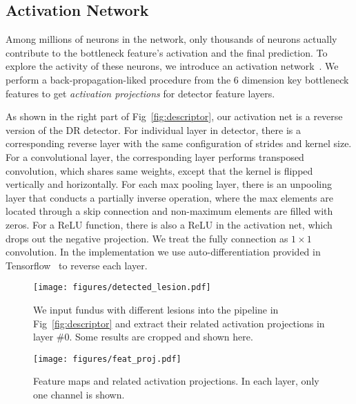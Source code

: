 \documentclass[letterpaper]{article} %
\begin{document}

	\subsection{Activation Network}

    Among millions of neurons in the network, only thousands of neurons actually contribute to the bottleneck feature's activation and the final prediction. To explore the activity of these neurons, we introduce an activation network~\cite{zeiler2014visualizing}. We perform a back-propagation-liked procedure from the $6$ dimension key bottleneck features to get \emph{activation projections} for detector feature layers.

    As shown in the right part of Fig~\ref{fig:descriptor}, our activation net is a reverse version of the DR detector. For individual layer in detector, there is a corresponding reverse layer with the same configuration of strides and kernel size. For a convolutional layer, the corresponding layer performs transposed convolution, which shares same weights, except that the kernel is flipped vertically and horizontally. For each max pooling layer, there is an unpooling layer that conducts a partially inverse operation, where the max elements are located through a skip connection and non-maximum elements are filled with zeros. For a ReLU function, there is also a ReLU in the activation net, which drops out the negative projection. We treat the fully connection as $1\times 1$ convolution. In the implementation we use auto-differentiation provided in Tensorflow~\cite{abadi2016tensorflow} to reverse each layer. %

	\begin{figure}[t]
		\begin{center}
			\texttt{[image: figures/detected\_lesion.pdf]}
		\end{center}
		\caption{We input fundus with different lesions into the pipeline in Fig~\ref{fig:descriptor} and extract their related activation projections in layer \#0. Some results are cropped and shown here. }
		\label{fig:detected_lesion}
	\end{figure}

	\begin{figure}[t]
		\begin{center}
			\texttt{[image: figures/feat\_proj.pdf]}
		\end{center}
		\caption{Feature maps and related activation projections. In each layer, only one channel is shown. }
		\label{fig:feat_proj}
	\end{figure}
\end{document}
